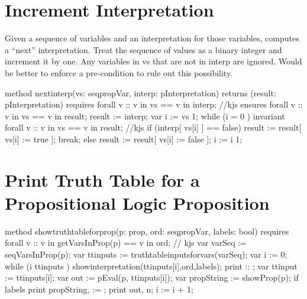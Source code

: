 \documentclass[letterpaper,10pt,english]{sphinxmanual}
\begin{document}
\section{Increment Interpretation}
\label{\detokenize{12-satisfiability:increment-interpretation}}
Given a sequence of variables and an interpretation for those
variables, computes a “next” interpretation.  Treat the sequence of
values as a binary integer and increment it by one. Any variables in
vs that are not in interp are ignored. Would be better to enforce a
pre-condition to rule out this possibility.

\begin{sphinxVerbatim}[commandchars=\\\{\}]
method next\PYGZus{}interp(vs: seq\PYGZlt{}propVar\PYGZgt{}, interp: pInterpretation)
    returns (result: pInterpretation)
    requires forall v :: v in vs ==\PYGZgt{} v in interp;   //kjs
    ensures forall v :: v in vs ==\PYGZgt{} v in result;
\PYGZob{}
    result := interp;
    var i := \textbar{} vs \textbar{} \PYGZhy{} 1;
    while (i \PYGZgt{}= 0 )
        invariant forall v :: v in vs ==\PYGZgt{} v in result;  //kjs
    \PYGZob{}
        if (interp[ vs[i] ] == false)
        \PYGZob{}
            result := result[ vs[i] := true ];
            break;
        \PYGZcb{}
        else
        \PYGZob{}
            result := result[ vs[i] := false ];
        \PYGZcb{}
        i := i \PYGZhy{} 1;
    \PYGZcb{}
\PYGZcb{}
\end{sphinxVerbatim}


\section{Print Truth Table for a Propositional Logic Proposition}
\label{\detokenize{12-satisfiability:print-truth-table-for-a-propositional-logic-proposition}}
\begin{sphinxVerbatim}[commandchars=\\\{\}]
method show\PYGZus{}truth\PYGZus{}table\PYGZus{}for\PYGZus{}prop(p: prop, ord: seq\PYGZlt{}propVar\PYGZgt{}, labels: bool)
    requires forall v :: v in getVarsInProp(p) ==\PYGZgt{} v in ord; // kjs
\PYGZob{}
    var varSeq := seqVarsInProp(p);
    var tt\PYGZus{}inputs := truth\PYGZus{}table\PYGZus{}inputs\PYGZus{}for\PYGZus{}vars(varSeq);
    var i := 0;
    while (i \PYGZlt{} \textbar{} tt\PYGZus{}inputs \textbar{})
    \PYGZob{}
        show\PYGZus{}interpretation(tt\PYGZus{}inputs[i],ord,labels);
        print \PYGZdq{} :: \PYGZdq{};
        var tt\PYGZus{}input := tt\PYGZus{}inputs[i];
        var out := pEval(p, tt\PYGZus{}inputs[i]);
        var propString := showProp(p);
        if labels \PYGZob{} print propString, \PYGZdq{} := \PYGZdq{}; \PYGZcb{}
        print out, \PYGZdq{}\PYGZbs{}n\PYGZdq{};
        i := i + 1;
    \PYGZcb{}
\PYGZcb{}
\end{sphinxVerbatim}
\end{document}
